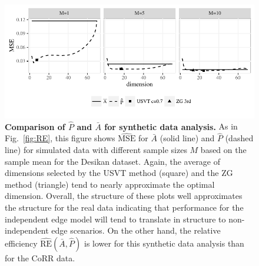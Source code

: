 \documentclass[journal,twoside,web]{ieeecolor}
\begin{document}
\begin{figure}[!htbp]
\centering
\includegraphics[width=1\linewidth]{sim_desikan.pdf}
\caption{
{\bf Comparison of $\hat{P}$ and $\bar{A}$ for synthetic data analysis.}
As in Fig.~\ref{fig:RE}, this figure shows $\hat{\mathrm{MSE}}$ for $\bar{A}$ (solid line) and $\hat{P}$ (dashed line) for simulated data with different sample sizes $M$ based on the sample mean for the Desikan dataset. Again, the average of dimensions selected by the USVT method (square) and the ZG method (triangle) tend to nearly approximate the optimal dimension.
Overall, the structure of these plots well approximates the structure for the real data indicating that performance for the independent edge model will tend to translate in structure to non-independent edge scenarios.
On the other hand, the relative efficiency $\hat{\mathrm{RE}}(\bar{A},\hat{P})$ is lower for this synthetic data analysis than for the CoRR data.}
\label{fig:sim_desikan}
\end{figure}





\end{document}
